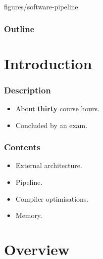 		{figures/software-pipeline}

%
%



%
%

\begin{frame}
  \titlepage

  \begin{center}
    \logos
  \end{center}
\end{frame}

%
%

\begin{frame}
  \frametitle{Outline}
  \tableofcontents
\end{frame}

%
%

\section{Introduction}


\begin{frame}
  \frametitle{Description}

  \begin{itemize}[<+->]
    \item
      About \textbf{thirty} course hours.
    \item
      Concluded by an exam.
  \end{itemize}
\end{frame}


\begin{frame}
  \frametitle{Contents}

  \begin{itemize}[<+->]
    \item
      External architecture.
    \item
      Pipeline.
    \item
      Compiler optimisations.
    \item
      Memory.
  \end{itemize}
\end{frame}

%
%

\section{Overview}

